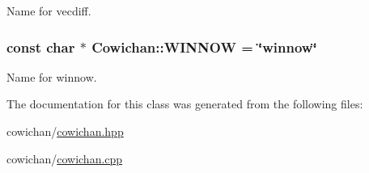 Name for vecdiff. \hypertarget{class_cowichan_a4d4acfeeb50c0552487a59a58b3f962}{
\subsubsection[{WINNOW}]{\setlength{\rightskip}{0pt plus 5cm}const char $\ast$ {\bf Cowichan::WINNOW} = \char`\"{}winnow\char`\"{}}}
\label{class_cowichan_a4d4acfeeb50c0552487a59a58b3f962}


Name for winnow. 

The documentation for this class was generated from the following files:\begin{CompactItemize}
\item 
cowichan/\hyperlink{cowichan_8hpp}{cowichan.hpp}\item 
cowichan/\hyperlink{cowichan_8cpp}{cowichan.cpp}\end{CompactItemize}
